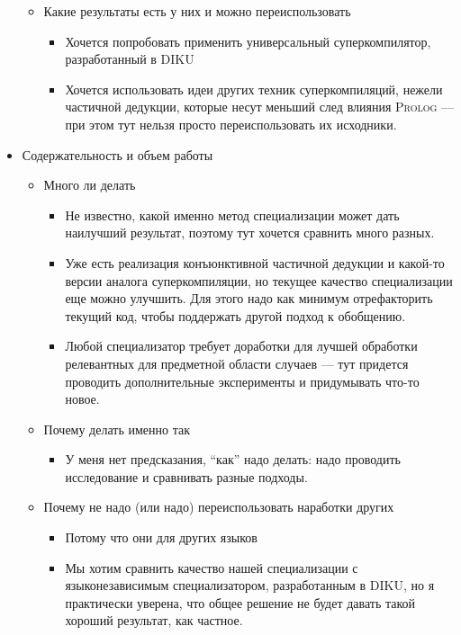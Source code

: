 \documentclass{article}
\newcommand{\prolog}{\textsc{Prolog }}
\begin{document}
\begin{itemize}
\begin{itemize}
\begin{itemize}
        \end{itemize}
        \item Какие результаты есть у них и можно переиспользовать
        \begin{itemize}
            \item Хочется попробовать применить универсальный суперкомпилятор, разработанный в DIKU
            \item Хочется использовать идеи других техник суперкомпиляций, нежели частичной дедукции, которые несут меньший след влияния \prolog --- при этом тут нельзя просто переиспользовать их исходники. 
        \end{itemize}
    \end{itemize}
    \item Содержательность и объем работы
    \begin{itemize}
        \item Много ли делать
        \begin{itemize}
            \item Не известно, какой именно метод специализации может дать наилучший результат, поэтому тут хочется сравнить много разных. 
            \item Уже есть реализация конъюнктивной частичной дедукции и какой-то версии аналога суперкомпиляции, но текущее качество специализации еще можно улучшить. Для этого надо как минимум отрефакторить текущий код, чтобы поддержать другой подход к обобщению.
            \item Любой специализатор требует доработки для лучшей обработки релевантных для предметной области случаев --- тут придется проводить дополнительные эксперименты и придумывать что-то новое.  
        \end{itemize} 
        \item Почему делать именно так 
        \begin{itemize}
            \item У меня нет предсказания, ``как'' надо делать: надо проводить исследование и сравнивать разные подходы.
        \end{itemize}
        \item Почему не надо (или надо) переиспользовать наработки других
        \begin{itemize}
            \item Потому что они для других языков
            \item Мы хотим сравнить качество нашей специализации с языконезависимым специализатором, разработанным в DIKU, но я практически уверена, что общее решение не будет давать такой хороший результат, как частное. 
        \end{itemize}
    \end{itemize}
\end{itemize}
\end{document}
